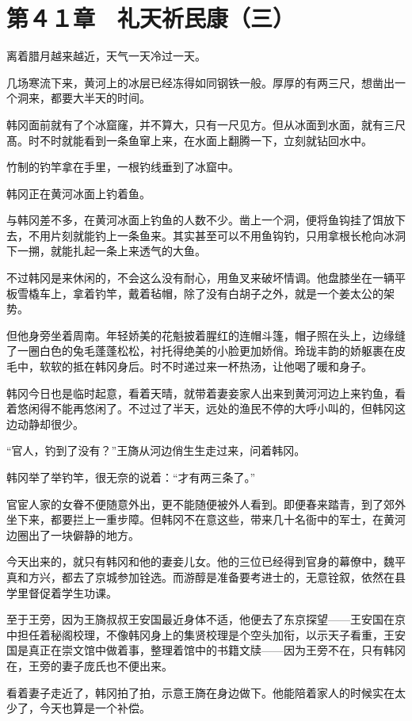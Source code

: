 \section{第４１章　礼天祈民康（三）}

离着腊月越来越近，天气一天冷过一天。

几场寒流下来，黄河上的冰层已经冻得如同钢铁一般。厚厚的有两三尺，想凿出一个洞来，都要大半天的时间。

韩冈面前就有了个冰窟窿，并不算大，只有一尺见方。但从冰面到水面，就有三尺髙。时不时就能看到一条鱼窜上来，在水面上翻腾一下，立刻就钻回水中。

竹制的钓竿拿在手里，一根钓线垂到了冰窟中。

韩冈正在黄河冰面上钓着鱼。

与韩冈差不多，在黄河冰面上钓鱼的人数不少。凿上一个洞，便将鱼钩挂了饵放下去，不用片刻就能钓上一条鱼来。其实甚至可以不用鱼钩钓，只用拿根长枪向冰洞下一搠，就能扎起一条上来透气的大鱼。

不过韩冈是来休闲的，不会这么没有耐心，用鱼叉来破坏情调。他盘膝坐在一辆平板雪橇车上，拿着钓竿，戴着毡帽，除了没有白胡子之外，就是一个姜太公的架势。

但他身旁坐着周南。年轻娇美的花魁披着腥红的连帽斗篷，帽子照在头上，边缘缝了一圈白色的兔毛蓬蓬松松，衬托得绝美的小脸更加娇俏。玲珑丰韵的娇躯裹在皮毛中，软软的抵在韩冈身后。时不时递过来一杯热汤，让他喝了暖和身子。

韩冈今日也是临时起意，看着天晴，就带着妻妾家人出来到黄河河边上来钓鱼，看着悠闲得不能再悠闲了。不过过了半天，远处的渔民不停的大呼小叫的，但韩冈这边动静却很少。

“官人，钓到了没有？”王旖从河边俏生生走过来，问着韩冈。

韩冈举了举钓竿，很无奈的说着：“才有两三条了。”

官宦人家的女眷不便随意外出，更不能随便被外人看到。即便春来踏青，到了郊外坐下来，都要拦上一重步障。但韩冈不在意这些，带来几十名衙中的军士，在黄河边圈出了一块僻静的地方。

今天出来的，就只有韩冈和他的妻妾儿女。他的三位已经得到官身的幕僚中，魏平真和方兴，都去了京城参加铨选。而游醇是准备要考进士的，无意铨叙，依然在县学里督促着学生功课。

至于王旁，因为王旖叔叔王安国最近身体不适，他便去了东京探望——王安国在京中担任着秘阁校理，不像韩冈身上的集贤校理是个空头加衔，以示天子看重，王安国是真正在崇文馆中做着事，整理着馆中的书籍文牍——因为王旁不在，只有韩冈在，王旁的妻子庞氏也不便出来。

看着妻子走近了，韩冈拍了拍，示意王旖在身边做下。他能陪着家人的时候实在太少了，今天也算是一个补偿。

